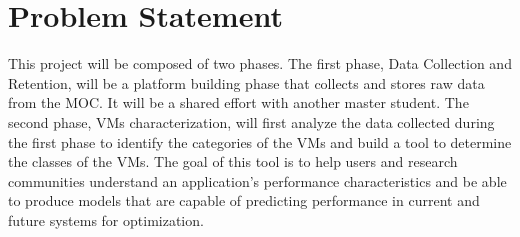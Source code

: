 \section{Problem Statement}
\label{sec:ProblemStatement}



This project will be composed of two phases. The first phase, Data Collection and Retention, will be a platform building phase that collects and stores raw data from the MOC. It will be a shared effort with another master student. The second phase, VMs characterization, will first analyze the data collected during the first phase to identify the categories of the VMs and build a tool to determine the classes of the VMs. The goal of this tool is to help users and research communities understand an application’s performance characteristics and be able to produce models that are capable of predicting performance in current and future systems for optimization.





